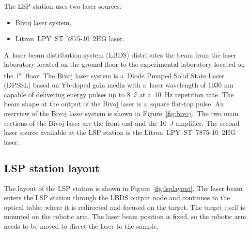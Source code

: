 The LSP station uses two laser sources:

\begin{itemize}
  \item Bivoj laser system,
  \item Litron~LPY~ST~7875-10~2HG laser.
\end{itemize}
A~laser beam distribution system (LBDS) distributes the beam from the laser laboratory located on the ground floor to the experimental laboratory located on the 1\textsuperscript{st} floor. The Bivoj laser system is a~Diode Pumped Solid State Laser (DPSSL) based on Yb-doped gain media with a~laser wavelength of 1030 nm capable of delivering energy pulses up to \SI{8}{\joule} at a~\SI{10}{\hertz} repetition rate. The beam shape at the output of the Bivoj laser is a~square flat-top pulse. An overview of the Bivoj laser system is shown in Figure~\ref{fig:bivoj}. The two main sections of the Bivoj laser are the front-end and the \SI{10}{\joule} amplifier. The second laser source available at the LSP station is the Litron~LPY~ST~7875-10~2HG laser.
 
 

 
 \subsection{LSP station layout}
 \label{sec:lsp_layout}

The layout of the LSP station is shown in Figure~\ref{fig:lsplayout}. The laser beam enters the LSP station through the LBDS output node and continues to the optical table, where it is redirected and focused on the target. The target itself is mounted on the robotic arm. The laser beam position is fixed, so the robotic arm needs to be moved to direct the laser to the sample.

